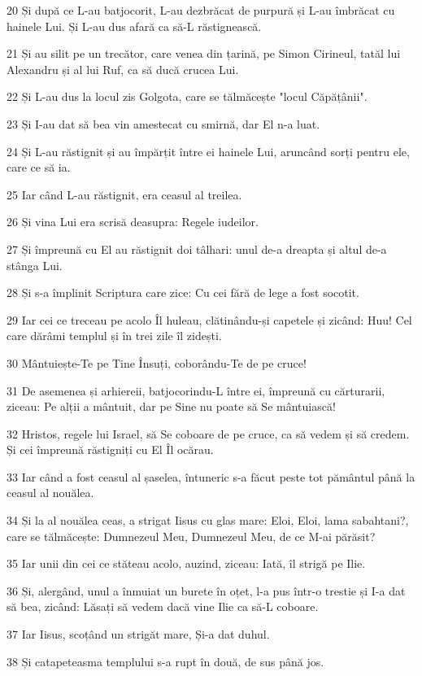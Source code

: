 \par 20 Și după ce L-au batjocorit, L-au dezbrăcat de purpură și L-au îmbrăcat cu hainele Lui. Și L-au dus afară ca să-L răstignească.
\par 21 Și au silit pe un trecător, care venea din țarină, pe Simon Cirineul, tatăl lui Alexandru și al lui Ruf, ca să ducă crucea Lui.
\par 22 Și L-au dus la locul zis Golgota, care se tălmăcește "locul Căpățânii".
\par 23 Și I-au dat să bea vin amestecat cu smirnă, dar El n-a luat.
\par 24 Și L-au răstignit și au împărțit între ei hainele Lui, aruncând sorți pentru ele, care ce să ia.
\par 25 Iar când L-au răstignit, era ceasul al treilea.
\par 26 Și vina Lui era scrisă deasupra: Regele iudeilor.
\par 27 Și împreună cu El au răstignit doi tâlhari: unul de-a dreapta și altul de-a stânga Lui.
\par 28 Și s-a împlinit Scriptura care zice: Cu cei fără de lege a fost socotit.
\par 29 Iar cei ce treceau pe acolo Îl huleau, clătinându-și capetele și zicând: Huu! Cel care dărâmi templul și în trei zile îl zidești.
\par 30 Mântuiește-Te pe Tine Însuți, coborându-Te de pe cruce!
\par 31 De asemenea și arhiereii, batjocorindu-L între ei, împreună cu cărturarii, ziceau: Pe alții a mântuit, dar pe Sine nu poate să Se mântuiască!
\par 32 Hristos, regele lui Israel, să Se coboare de pe cruce, ca să vedem și să credem. Și cei împreună răstigniți cu El Îl ocărau.
\par 33 Iar când a fost ceasul al șaselea, întuneric s-a făcut peste tot pământul până la ceasul al nouălea.
\par 34 Și la al nouălea ceas, a strigat Iisus cu glas mare: Eloi, Eloi, lama sabahtani?, care se tălmăcește: Dumnezeul Meu, Dumnezeul Meu, de ce M-ai părăsit?
\par 35 Iar unii din cei ce stăteau acolo, auzind, ziceau: Iată, îl strigă pe Ilie.
\par 36 Și, alergând, unul a înmuiat un burete în oțet, l-a pus într-o trestie și I-a dat să bea, zicând: Lăsați să vedem dacă vine Ilie ca să-L coboare.
\par 37 Iar Iisus, scoțând un strigăt mare, Și-a dat duhul.
\par 38 Și catapeteasma templului s-a rupt în două, de sus până jos.
